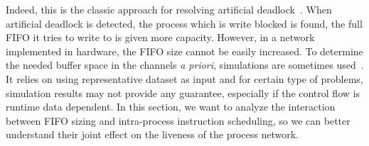 Indeed, this is the classic approach for resolving artificial deadlock~\cite{boundedwrite}. 
When artificial deadlock is detected, the process which is write blocked is found, the full FIFO it tries to write to is given more capacity. 
However, in a network implemented in hardware, the FIFO size cannot be easily increased.
To determine the needed buffer space in the channels \textit{a priori}, simulations are sometimes used~\cite{buck1994ptolemy}\cite{efficientNetwork}. It relies 
on using representative dataset as input and for certain type of problems, simulation results may not provide any guarantee, especially if the control flow is runtime data dependent. In this section, we want to analyze the interaction between FIFO
sizing and intra-process instruction scheduling, 
so we can 
better understand
their joint effect on the liveness of the process network. 

